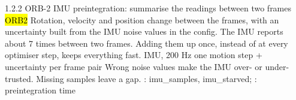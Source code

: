 \begin{frame}{1.2.2 \;ORB-2 \;IMU preintegration: summarise the readings between two frames}
  \hl{ORB2}
  {Rotation, velocity and position change between the frames, with an
   uncertainty built from the IMU noise values in the config.}
  {The IMU reports about 7 times between two frames. Adding them up once,
   instead of at every optimiser step, keeps everything fast.}
  {IMU, 200 Hz}
  {one motion step + uncertainty per frame pair}
  {Wrong noise values make the IMU over- or under-trusted. Missing samples leave a gap.}
  {: imu\_samples, imu\_starved;
   : preintegration time}
\end{frame}

